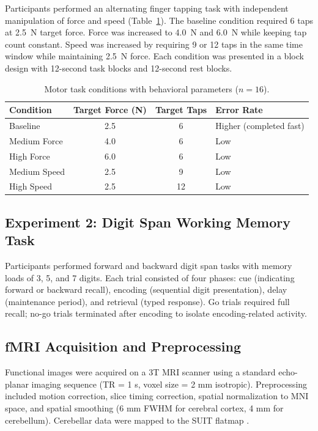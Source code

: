 \documentclass[11pt]{article}
\begin{document}
Participants performed an alternating finger tapping task with independent manipulation of force and speed (Table~\ref{tab:motor}). The baseline condition required 6 taps at 2.5~N target force. Force was increased to 4.0~N and 6.0~N while keeping tap count constant. Speed was increased by requiring 9 or 12 taps in the same time window while maintaining 2.5~N force. Each condition was presented in a block design with 12-second task blocks and 12-second rest blocks.

\begin{table}[h]
\centering
\caption{Motor task conditions with behavioral parameters ($n = 16$).}
\label{tab:motor}
\begin{tabular}{lccl}
\toprule
Condition & Target Force (N) & Target Taps & Error Rate \\
\midrule
Baseline & 2.5 & 6 & Higher (completed fast) \\
Medium Force & 4.0 & 6 & Low \\
High Force & 6.0 & 6 & Low \\
Medium Speed & 2.5 & 9 & Low \\
High Speed & 2.5 & 12 & Low \\
\bottomrule
\end{tabular}
\end{table}

\subsection{Experiment 2: Digit Span Working Memory Task}

Participants performed forward and backward digit span tasks with memory loads of 3, 5, and 7 digits. Each trial consisted of four phases: cue (indicating forward or backward recall), encoding (sequential digit presentation), delay (maintenance period), and retrieval (typed response). Go trials required full recall; no-go trials terminated after encoding to isolate encoding-related activity.

\subsection{fMRI Acquisition and Preprocessing}

Functional images were acquired on a 3T MRI scanner using a standard echo-planar imaging sequence (TR = 1 s, voxel size = 2 mm isotropic). Preprocessing included motion correction, slice timing correction, spatial normalization to MNI space, and spatial smoothing (6 mm FWHM for cerebral cortex, 4 mm for cerebellum). Cerebellar data were mapped to the SUIT flatmap \citep{diedrichsen2009}.
\end{document}
